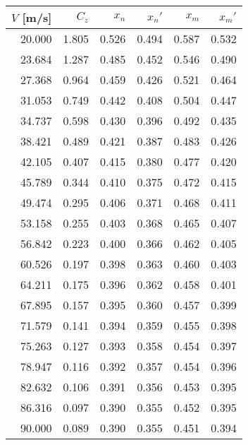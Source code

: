 \begin{tabular}{rrrrrr}
\toprule
 $V$ [m/s] &  $C_z$ &  $x_n$ &  $x_n'$ &  $x_m$ &  $x_m'$ \\
\midrule
    20.000 &  1.805 &  0.526 &   0.494 &  0.587 &   0.532 \\
    23.684 &  1.287 &  0.485 &   0.452 &  0.546 &   0.490 \\
    27.368 &  0.964 &  0.459 &   0.426 &  0.521 &   0.464 \\
    31.053 &  0.749 &  0.442 &   0.408 &  0.504 &   0.447 \\
    34.737 &  0.598 &  0.430 &   0.396 &  0.492 &   0.435 \\
    38.421 &  0.489 &  0.421 &   0.387 &  0.483 &   0.426 \\
    42.105 &  0.407 &  0.415 &   0.380 &  0.477 &   0.420 \\
    45.789 &  0.344 &  0.410 &   0.375 &  0.472 &   0.415 \\
    49.474 &  0.295 &  0.406 &   0.371 &  0.468 &   0.411 \\
    53.158 &  0.255 &  0.403 &   0.368 &  0.465 &   0.407 \\
    56.842 &  0.223 &  0.400 &   0.366 &  0.462 &   0.405 \\
    60.526 &  0.197 &  0.398 &   0.363 &  0.460 &   0.403 \\
    64.211 &  0.175 &  0.396 &   0.362 &  0.458 &   0.401 \\
    67.895 &  0.157 &  0.395 &   0.360 &  0.457 &   0.399 \\
    71.579 &  0.141 &  0.394 &   0.359 &  0.455 &   0.398 \\
    75.263 &  0.127 &  0.393 &   0.358 &  0.454 &   0.397 \\
    78.947 &  0.116 &  0.392 &   0.357 &  0.454 &   0.396 \\
    82.632 &  0.106 &  0.391 &   0.356 &  0.453 &   0.395 \\
    86.316 &  0.097 &  0.390 &   0.355 &  0.452 &   0.395 \\
    90.000 &  0.089 &  0.390 &   0.355 &  0.451 &   0.394 \\
\bottomrule
\end{tabular}
